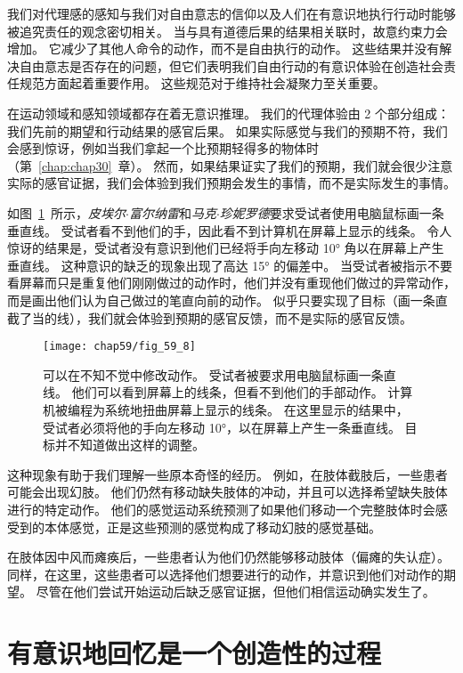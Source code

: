 我们对代理感的感知与我们对自由意志的信仰以及人们在有意识地执行行动时能够被追究责任的观念密切相关。
当与具有道德后果的结果相关联时，故意约束力会增加。
它减少了其他人命令的动作，而不是自由执行的动作。
这些结果并没有解决自由意志是否存在的问题，但它们表明我们自由行动的有意识体验在创造社会责任规范方面起着重要作用。
这些规范对于维持社会凝聚力至关重要。


在运动领域和感知领域都存在着无意识推理。
我们的代理体验由 2 个部分组成：
我们先前的期望和行动结果的感官后果。
如果实际感觉与我们的预期不符，我们会感到惊讶，例如当我们拿起一个比预期轻得多的物体时（第~\ref{chap:chap30}~章）。
然而，如果结果证实了我们的预期，我们就会很少注意实际的感官证据，我们会体验到我们预期会发生的事情，而不是实际发生的事情。


如图~\ref{fig:59_8}~所示，\textit{皮埃尔$\cdot$富尔纳雷}和\textit{马克$\cdot$珍妮罗德}要求受试者使用电脑鼠标画一条垂直线。
受试者看不到他们的手，因此看不到计算机在屏幕上显示的线条。
令人惊讶的结果是，受试者没有意识到他们已经将手向左移动 10° 角以在屏幕上产生垂直线。
这种意识的缺乏的现象出现了高达 15° 的偏差中。
当受试者被指示不要看屏幕而只是重复他们刚刚做过的动作时，他们并没有重现他们做过的异常动作，而是画出他们认为自己做过的笔直向前的动作。
似乎只要实现了目标（画一条直截了当的线），我们就会体验到预期的感官反馈，而不是实际的感官反馈。


\begin{figure}[htbp]
	\centering
	\texttt{[image: chap59/fig\_59\_8]}
	\caption{可以在不知不觉中修改动作。
		受试者被要求用电脑鼠标画一条直线。
		他们可以看到屏幕上的线条，但看不到他们的手部动作。
		计算机被编程为系统地扭曲屏幕上显示的线条。
		在这里显示的结果中，受试者必须将他的手向左移动 10°，以在屏幕上产生一条垂直线。
		目标并不知道做出这样的调整\cite{fourneret1998limited}。}
	\label{fig:59_8}
\end{figure}


这种现象有助于我们理解一些原本奇怪的经历。
例如，在肢体截肢后，一些患者可能会出现幻肢。
他们仍然有移动缺失肢体的冲动，并且可以选择希望缺失肢体进行的特定动作。
他们的感觉运动系统预测了如果他们移动一个完整肢体时会感受到的本体感觉，正是这些预测的感觉构成了移动幻肢的感觉基础。


在肢体因中风而瘫痪后，一些患者认为他们仍然能够移动肢体（偏瘫的失认症）。
同样，在这里，这些患者可以选择他们想要进行的动作，并意识到他们对动作的期望。
尽管在他们尝试开始运动后缺乏感官证据，但他们相信运动确实发生了。



\section{有意识地回忆是一个创造性的过程}

